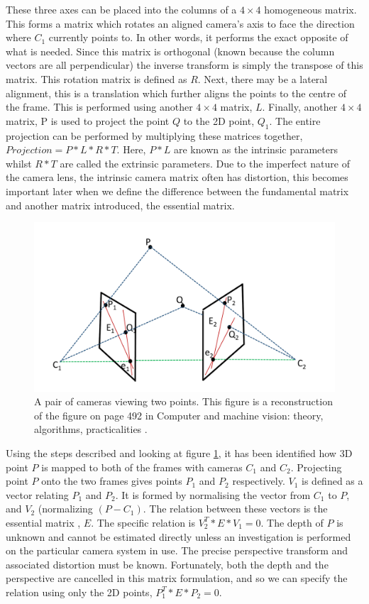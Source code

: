 These three axes can be placed into the columns of a $4 \times 4$ homogeneous matrix. This forms a matrix which rotates an aligned camera's axis to face the direction where $C_1$ currently points to. In other words, it performs the exact opposite of what is needed. Since this matrix is orthogonal (known because the column vectors are all perpendicular) the inverse transform is simply the transpose of this matrix. This rotation matrix is defined as $R$. Next, there may be a lateral alignment, this is a translation which further aligns the points to the centre of the frame. This is performed using another $4 \times 4$ matrix, $L$. Finally, another $4 \times 4$ matrix, P is used to project the point $Q$ to the 2D point, $Q_1$. The entire projection can be performed by multiplying these matrices together, $Projection = P * L * R * T$. Here, $P * L$ are known as the intrinsic parameters whilst $R * T$ are called the extrinsic parameters. Due to the imperfect nature of the camera lens, the intrinsic camera matrix often has distortion, this becomes important later when we define the difference between the fundamental matrix and another matrix introduced, the essential matrix.

\begin{figure}[!htb]
	\includegraphics[width=5.0in]{images/introfm1}
	\caption{A pair of cameras viewing two points. This figure is a reconstruction of the figure on page 492 in Computer and machine vision: theory, algorithms, practicalities \cite{Davies12Computer}.}
	\label{fig:INTRO_FMA1}
\end{figure}  

Using the steps described and looking at figure \ref{fig:INTRO_FMA1}, it has been identified how 3D point $P$ is mapped to both of the frames with cameras $C_1$ and $C_2$. Projecting point $P$ onto the two frames gives points $P_1$ and $P_2$ respectively. $V_1$ is defined as a vector relating $P_1$ and $P_2$. It is formed by normalising the vector from $C_1$ to $P$, and $V_2$ (normalizing $(P - C_1)$. The relation between these vectors is the essential matrix \cite{Davies12Computer}, $E$. The specific relation is $V_2^{T} * E * V_1 = 0$. The depth of $P$ is unknown and cannot be estimated directly unless an investigation is performed on the particular camera system in use. The precise perspective transform and associated distortion must be known. Fortunately, both the depth and the perspective are cancelled in this matrix formulation, and so we can specify the relation using only the 2D points, $P_1^T * E * P_2 = 0$. \\

